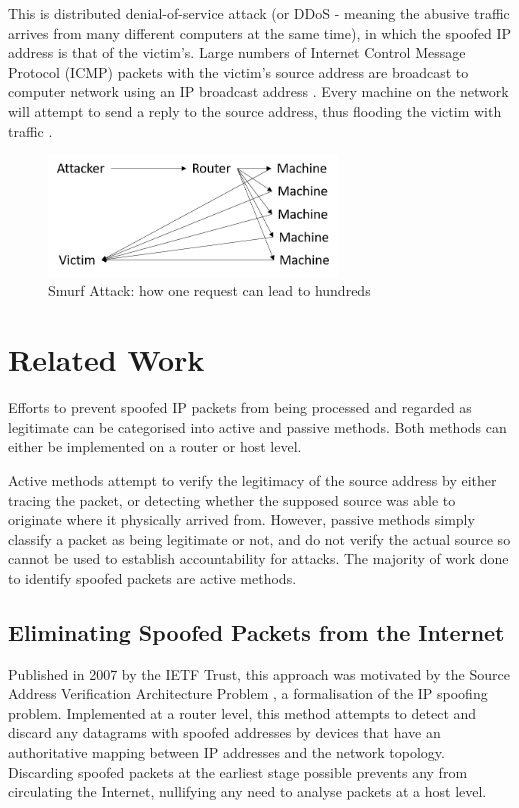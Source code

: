\documentclass[12pt,twoside]{article}
\begin{document}
This is distributed denial-of-service attack (or DDoS - meaning the abusive traffic arrives from many different computers at the same time), in which the spoofed IP address is that of the victim's. Large numbers of Internet Control Message Protocol (ICMP) packets with the victim's source address are broadcast to computer network using an IP broadcast address \cite{rfc919}. Every machine on the network will attempt to send a reply to the source address, thus flooding the victim with traffic \cite{smurf}. 

\begin{figure}[h]
	\begin{center}
		\includegraphics[width=7.67cm, height=3.22cm]{figures/smurf}
	\end{center}
	\caption{Smurf Attack: how one request can lead to hundreds}
	\label{figure_smurf} 
\end{figure}

\section{Related Work} \label{defences}
Efforts to prevent spoofed IP packets from being processed and regarded as legitimate can be categorised into active and passive methods. Both methods can either be implemented on a router or host level. 

Active methods attempt to verify the legitimacy of the source address by either tracing the packet, or detecting whether the supposed source was able to originate where it physically arrived from. However, passive methods simply classify a packet as being legitimate or not, and do not verify the actual source so cannot be used to establish accountability for attacks. The majority of work done to identify spoofed packets are active methods.

\subsection{Eliminating Spoofed Packets from the Internet \cite{eliminating}}
Published in 2007 by the IETF Trust, this approach was motivated by the Source Address Verification Architecture Problem \cite{spoofProblemStatement}, a formalisation of the IP spoofing problem. Implemented at a router level, this method attempts to detect and discard any datagrams with spoofed addresses by devices that have an authoritative mapping between IP addresses and the network topology. Discarding spoofed packets at the earliest stage possible prevents any from circulating the Internet, nullifying any need to analyse packets at a host level.
\end{document}
